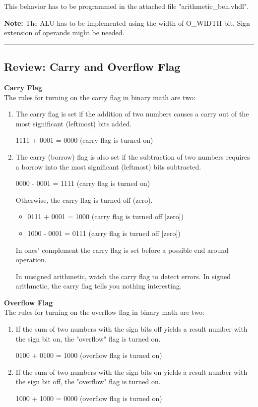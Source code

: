 \documentclass[a4paper,12pt]{article}
\begin{document}
This behavior has to be programmed in the attached file "arithmetic\_beh.vhdl".


\textbf{Note:} The ALU has to be implemented using the width of {{O_WIDTH}} bit. Sign extension
of operands might be needed.


\rule{16cm}{0.4pt}\par
\subsection*{Review: Carry and Overflow Flag}

\textbf{Carry Flag}\\
The rules for turning on the carry flag in binary math are two:
\begin{enumerate}
\item The carry flag is set if the addition of two numbers causes a carry
   out of the most significant (leftmost) bits added.

   1111 + 0001 = 0000 (carry flag is turned on)

\item The carry (borrow) flag is also set if the subtraction of two numbers
   requires a borrow into the most significant (leftmost) bits subtracted.

   0000 - 0001 = 1111 (carry flag is turned on)

Otherwise, the carry flag is turned off (zero).
\begin{itemize}
\item 0111 + 0001 = 1000 (carry flag is turned off [zero])
\item 1000 - 0001 = 0111 (carry flag is turned off [zero])
\end{itemize}

In ones' complement the carry flag is set before a possible end around operation.

In unsigned arithmetic, watch the carry flag to detect errors.
In signed arithmetic, the carry flag tells you nothing interesting.

\end{enumerate}

\textbf{Overflow Flag}\\
The rules for turning on the overflow flag in binary math are two:
\begin{enumerate}
\item If the sum of two numbers with the sign bits off yields a result number
   with the sign bit on, the "overflow" flag is turned on.

   0100 + 0100 = 1000 (overflow flag is turned on)

\item If the sum of two numbers with the sign bits on yields a result number
   with the sign bit off, the "overflow" flag is turned on.

   1000 + 1000 = 0000 (overflow flag is turned on)
\end{enumerate}
\end{document}
